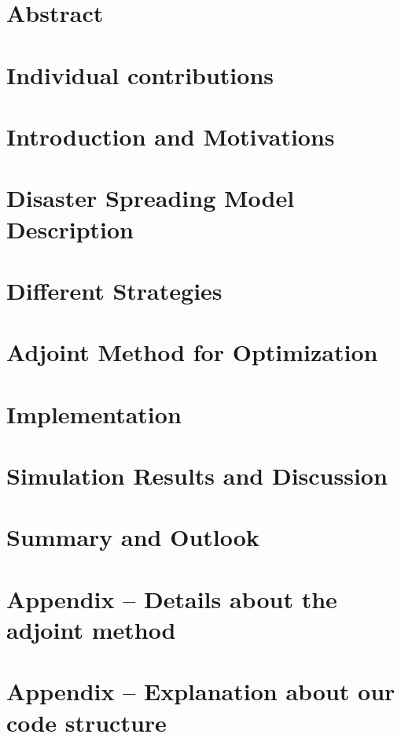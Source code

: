 \documentclass[11pt]{article}
\newcommand{\RN}[1]{%
  \textup{\uppercase\expandafter{\romannumeral#1}}%
}
\begin{document}
\tableofcontents

\newpage




\section{Abstract}


\section{Individual contributions}


\section{Introduction and Motivations}


\section{Disaster Spreading Model Description}
\label{sec:spreadingmodel}


\section{Different Strategies}
\label{sec:methods}


\section{Adjoint Method for Optimization}
\label{sec:adjointmethod}


\section{Implementation}
\label{sec:implementation}


\section{Simulation Results and Discussion}
\label{sec:results}


\section{Summary and Outlook}
\label{sec:summary}




{}


\section{Appendix \RN{1} -- Details about the adjoint method}
\label{sec:appendix1}


\section{Appendix \RN{2} -- Explanation about our code structure}
\label{sec:appendix2}

\end{document}
